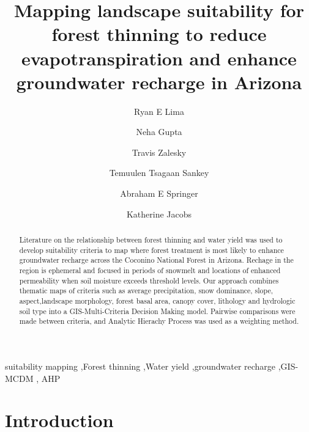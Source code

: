 \documentclass[
  number]{elsarticle}
\begin{document}
\begin{frontmatter}
\title{Mapping landscape suitability for forest thinning to reduce
evapotranspiration and enhance groundwater recharge in Arizona}
\author[1]{Ryan E Lima%
%
}
\author[2]{Neha Gupta%
%
}

\author[2]{Travis Zalesky%
%
}

\author[1]{Temuulen Tsagaan Sankey%
%
}

\author[1]{Abraham E Springer%
%
}

\author[2]{Katherine Jacobs%
%
}









        
\begin{abstract}
Literature on the relationship between forest thinning and water yield
was used to develop suitability criteria to map where forest treatment
is most likely to enhance groundwater recharge across the Coconino
National Forest in Arizona. Rechage in the region is ephemeral and
focused in periods of snowmelt and locations of enhanced permeability
when soil moisture exceeds threshold levels. Our approach combines
thematic maps of criteria such as average precipitation, snow dominance,
slope, aspect,landscape morphology, forest basal area, canopy cover,
lithology and hydrologic soil type into a GIS-Multi-Criteria Decision
Making model. Pairwise comparisons were made between criteria, and
Analytic Hierachy Process was used as a weighting method.
\end{abstract}





\begin{keyword}
    suitability mapping \sep Forest thinning \sep Water
yield \sep groundwater recharge \sep GIS-MCDM \sep 
    AHP
\end{keyword}
\end{frontmatter}
    
\section{Introduction}\label{introduction}
\end{document}

